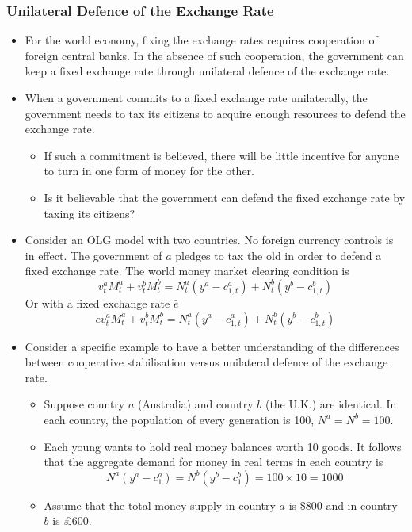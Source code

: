 \documentclass[a4paper,twoside]{article}
\newif\IfInSansMode
\numberwithin{equation}{section}
\numberwithin{figure}{section}
\begin{document}
\subsubsection{Unilateral Defence of the Exchange Rate}
	\begin{itemize}
		\item For the world economy, fixing the exchange rates requires cooperation of foreign central banks. In the absence of such cooperation, the government can keep a fixed exchange rate through unilateral defence of the exchange rate.
		\item When a government commits to a fixed exchange rate unilaterally, the government needs to tax its citizens to acquire enough resources to defend the exchange rate.
		\begin{itemize}
			\item If such a commitment is believed, there will be little incentive for anyone to turn in one form of money for the other.
			\item Is it believable that the government can defend the fixed exchange rate by taxing its citizens?
		\end{itemize}
		\item Consider an OLG model with two countries. No foreign currency controls is in effect. The government of \( a \) pledges to tax the old in order to defend a fixed exchange rate. The world money market clearing condition is
		\[
			v_t^a M_t^a + v_t^b M_t^b = N_t^a \left(y^a - c_{1,t}^a\right) + N_t^b \left(y^b - c_{1,t}^b\right) 
		\]
		Or with a fixed exchange rate \( \bar{e} \)
		\[
			\bar{e}v_t^a M_t^a + v_t^b M_t^b = N_t^a \left(y^a - c_{1,t}^a\right) + N_t^b \left(y^b - c_{1,t}^b\right)
		\]
		\item Consider a specific example to have a better understanding of the differences between cooperative stabilisation versus unilateral defence of the exchange rate.
		\begin{itemize}
			\item Suppose country \( a \) (Australia) and country \( b \) (the U.K.) are identical. In each country, the population of every generation is 100, \( N^a = N^b = 100 \).
			\item Each young wants to hold real money balances worth 10 goods. It follows that the aggregate demand for money in real terms in each country is
			\[
				N^a \left(y^a - c_1^a\right) = N^b \left(y^b - c_1^b\right) = 100 \times 10 = 1000
			\]
			\item Assume that the total money supply in country \( a \) is \$800 and in country \( b \) is \pounds600.

\end{itemize}
\end{itemize}
\end{document}
